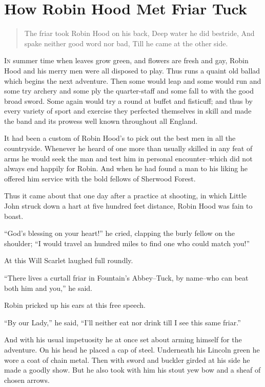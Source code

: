 \chapter{How Robin Hood Met Friar Tuck}

\begin{quote}
The friar took Robin Hood on his back,
Deep water he did bestride,
And spake neither good word nor bad,
Till he came at the other side.
\end{quote}

\lettrine{I}{n} summer time when leaves grow green, and flowers are fresh and gay,
Robin Hood and his merry men were all disposed to play. Thus runs a
quaint old ballad which begins the next adventure. Then some would leap
and some would run and some try archery and some ply the quarter-staff
and some fall to with the good broad sword. Some again would try a round
at buffet and fisticuff; and thus by every variety of sport and exercise
they perfected themselves in skill and made the band and its prowess
well known throughout all England.

It had been a custom of Robin Hood's to pick out the best men in all the
countryside. Whenever he heard of one more than usually skilled in any
feat of arms he would seek the man and test him in personal
encounter--which did not always end happily for Robin. And when he had
found a man to his liking he offered him service with the bold fellows
of Sherwood Forest.

Thus it came about that one day after a practice at shooting, in which
Little John struck down a hart at five hundred feet distance, Robin Hood
was fain to boast.

``God's blessing on your heart!'' he cried, clapping the burly fellow on
the shoulder; ``I would travel an hundred miles to find one who could
match you!''

At this Will Scarlet laughed full roundly.

``There lives a curtall friar in Fountain's Abbey--Tuck, by name--who
can beat both him and you,'' he said.

Robin pricked up his ears at this free speech.

``By our Lady,'' he said, ``I'll neither eat nor drink till I see this
same friar.''

And with his usual impetuosity he at once set about arming himself for
the adventure. On his head he placed a cap of steel. Underneath his
Lincoln green he wore a coat of chain metal. Then with sword and buckler
girded at his side he made a goodly show. But he also took with him his
stout yew bow and a sheaf of chosen arrows.

